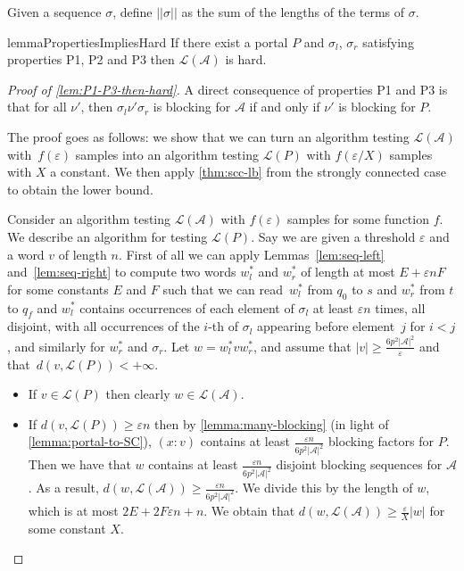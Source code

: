 \documentclass[letterpaper, USenglish, cleveref, autoref, thm-restate, numberwithinsect]{lipics-v2021}
\theoremstyle{theorem}
\theoremstyle{definition}
\newcommand{\Aa}{\mathcal{A}}
\newcommand{\eps}{\varepsilon}
\newcommand{\lang}[1]{\mathcal{L}(#1)}
\newcommand{\sigmasize}[1]{|| #1 ||}
\newcommand{\timedword}[2]{(#1:#2)}
\begin{document}
Given a sequence $\sigma$, define $\sigmasize{\sigma}$ as the sum of the lengths of the terms of $\sigma$.
\begin{restatable}{lemma}{PropertiesImpliesHard}
	\label{lem:P1-P3-then-hard}
	If there exist a portal $P$ and $\sigma_l$, $\sigma_r$ satisfying properties P1, P2 and P3 then $\lang{\Aa}$  is hard.
\end{restatable}
\begin{proof}[Proof of \cref{lem:P1-P3-then-hard}]
	A direct consequence of properties P1 and P3 is that for all $\nu'$, then $\sigma_l \nu' \sigma_r$ is blocking for $\Aa$ if and only if $\nu'$ is blocking for $P$.
	
	The proof goes as follows: we show that we can turn an algorithm testing $\lang{\Aa}$ with~$f(\eps)$ samples into an algorithm testing $\lang{P}$ with $f(\eps/X)$ samples with $X$ a constant.
	We then apply \cref{thm:scc-lb} from the strongly connected case to obtain the lower bound.
	
	Consider an algorithm testing $\lang{\Aa}$ with $f(\eps)$ samples for some function $f$.
	We describe an algorithm for testing $\lang{P}$.
	Say we are given a threshold $\eps$ and a word $v$ of length $n$.
	First of all we can apply Lemmas~\ref{lem:seq-left} and~\ref{lem:seq-right} to compute two words $w_l^*$ and $w_r^*$ of length at most $E + \eps n F$ for some constants $E$ and $F$ such that we can read~$w_l^*$ from $q_{0}$ to $s$ and $w_r^*$ from $t$ to $q_f$ and $w_l^*$ contains occurrences of each element of $\sigma_l$ at least $\eps n$ times, all disjoint, with all occurrences of the $i$-th of $\sigma_l$ appearing before element~$j$ for $i<j$, and similarly for $w_r^*$ and $\sigma_r$.
	Let $w = w_l^* v w_r^*$, and assume that $|v| \geq \frac{6p^2|\Aa|^2}{\eps}$ and that~$d(v, \lang{P}) < + \infty$.
	
	\begin{itemize}
		\item If $v \in \lang{P}$ then clearly $w \in \lang{\Aa}$.
		\item If $d(v, \lang{P}) \geq \eps n$ then by \cref{lemma:many-blocking} (in light of \cref{lemma:portal-to-SC}), $\timedword{x}{v}$ contains at least $\frac{\eps n}{6p^2|\Aa|^2}$ blocking factors for $P$. 
		Then we have that $w$ contains at least $\frac{\eps n}{6p^2|\Aa|^2}$ disjoint blocking sequences for $\Aa$.
		As a result, $d(w, \lang{\Aa}) \geq \frac{\eps n}{6p^2|\Aa|^2}$. 
		We divide this by the length of $w$, which is at most $2E +  2F \eps n + n$. We obtain that $d(w, \lang{\Aa}) \geq \frac{\eps}{X} |w|$ for some constant $X$. 
	\end{itemize}
	

\end{proof}
\end{document}
